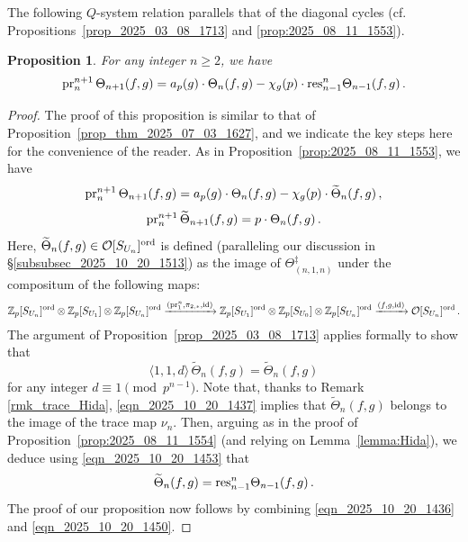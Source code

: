 \documentclass{amsart}
\numberwithin{equation}{section}
\newtheorem{proposition}[theorem]{Proposition}
\newcommand{\Zp}{\mathbb{Z}_p}
\newcommand{\cO}{\mathcal{O}}
\newcommand{\res}{\textup{res}}
\begin{document}
The following $Q$-system relation parallels that of the diagonal cycles (cf. Propositions~\ref{prop_2025_03_08_1713} and \ref{prop:2025_08_11_1553}).

\begin{proposition}
    \label{prop_2025_10_15_1640}
    For any integer $n\geq 2$, we have
    $${\rm pr}_{n}^{n+1}\,\Theta_{n+1}(f,g)=a_p(g)\cdot\Theta_{n}(f,g)-\chi_g(p)\cdot \res_{n-1}^{n}\Theta_{n-1}(f,g)\,.$$
\end{proposition}

\begin{proof}
The proof of this proposition is similar to that of Proposition~\ref{prop_thm_2025_07_03_1627}, and we indicate the key steps here for the convenience of the reader. As in Proposition~\ref{prop:2025_08_11_1553}, we have
\begin{equation}
    \label{eqn_2025_10_20_1436}
 {\rm pr}_{n}^{n+1}\,\Theta_{n+1}(f,g)=a_p(g)\cdot\Theta_{n}(f,g)-\chi_g(p)\cdot\widetilde\Theta_{n}(f,g)\,,   
\end{equation}
\begin{equation}
    \label{eqn_2025_10_20_1453}
 {\rm pr}_{n}^{n+1}\,\widetilde\Theta_{n+1}(f,g)=p\cdot\Theta_{n}(f,g)\,.
\end{equation}
Here, $\widetilde\Theta_{n}(f,g) \in  \cO[S_{U_n}]^{\rm ord}$ is defined (paralleling our discussion in \S\ref{subsubsec_2025_10_20_1513}) as the image of $\Theta_{(n,1,n)}^{\ddagger}$ under the compositum of the following maps: 
\begin{align*}
    \Zp[S_{U_n}]^{\rm ord}\otimes \Zp[S_{U_1}] \otimes \Zp[S_{U_n}]^{\rm ord}\xrightarrow{({\rm pr}_{1}^n,\pi_{2,*},{\rm id})} \Zp[S_{U_1}]^{\rm ord}\otimes \Zp[S_{U_0}] \otimes \Zp[S_{U_n}]^{\rm ord}\xrightarrow{(f,g,{\rm id})} \cO[S_{U_n}]^{\rm ord}\,.
\end{align*}
The argument of Proposition~\ref{prop_2025_03_08_1713} applies formally to show that 
\begin{equation}
    \label{eqn_2025_10_20_1437}
    \langle 1,1,d\rangle\,\widetilde\Theta_{n}(f,g)= \widetilde\Theta_{n}(f,g)
\end{equation}
for any integer $d\equiv 1 \pmod{p^{n-1}}$. Note that, thanks to Remark \ref{rmk_trace_Hida}, \eqref{eqn_2025_10_20_1437} implies that $\widetilde\Theta_{n}(f,g)$ belongs to the image of the trace map $\nu_n$. Then, arguing as in the proof of Proposition~\ref{prop:2025_08_11_1554} (and relying on Lemma~\ref{lemma:Hida}), we deduce using \eqref{eqn_2025_10_20_1453} that 
\begin{equation}
    \label{eqn_2025_10_20_1450}
    \widetilde\Theta_{n}(f,g) = \res_{n-1}^{n}\Theta_{n-1}(f,g)\,.
\end{equation}
The proof of our proposition now follows by combining \eqref{eqn_2025_10_20_1436} and \eqref{eqn_2025_10_20_1450}.
\end{proof}
\end{document}
